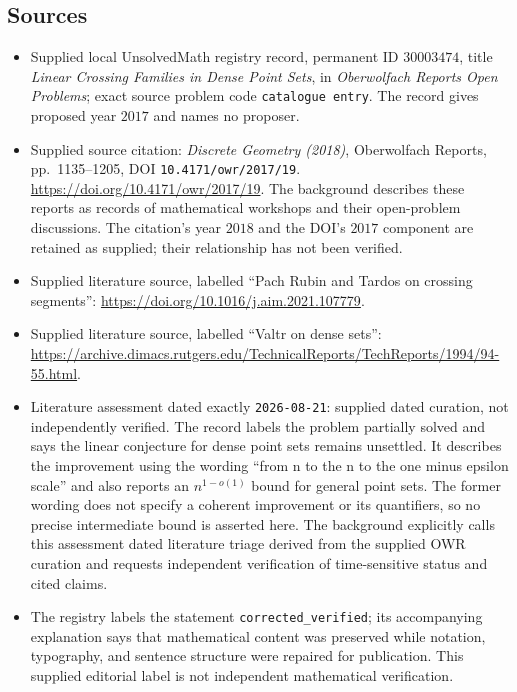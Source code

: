 \documentclass[11pt]{article}
\begin{document}
\subsection{Sources}
\begin{itemize}
\item Supplied local UnsolvedMath registry record, permanent ID \(30003474\), title \emph{Linear Crossing Families in Dense Point Sets}, in \emph{Oberwolfach Reports Open Problems}; exact source problem code \texttt{catalogue entry}. The record gives proposed year \(2017\) and names no proposer.
\item Supplied source citation: \emph{Discrete Geometry (2018)}, Oberwolfach Reports, pp.\ 1135--1205, DOI \texttt{10.4171/owr/2017/19}. \url{https://doi.org/10.4171/owr/2017/19}. The background describes these reports as records of mathematical workshops and their open-problem discussions. The citation's year \(2018\) and the DOI's \(2017\) component are retained as supplied; their relationship has not been verified.
\item Supplied literature source, labelled ``Pach Rubin and Tardos on crossing segments'': \url{https://doi.org/10.1016/j.aim.2021.107779}.
\item Supplied literature source, labelled ``Valtr on dense sets'': \url{https://archive.dimacs.rutgers.edu/TechnicalReports/TechReports/1994/94-55.html}.
\item Literature assessment dated exactly \texttt{2026-08-21}: supplied dated curation, not independently verified. The record labels the problem partially solved and says the linear conjecture for dense point sets remains unsettled. It describes the improvement using the wording ``from n to the n to the one minus epsilon scale'' and also reports an \(n^{1-o(1)}\) bound for general point sets. The former wording does not specify a coherent improvement or its quantifiers, so no precise intermediate bound is asserted here. The background explicitly calls this assessment dated literature triage derived from the supplied OWR curation and requests independent verification of time-sensitive status and cited claims.
\item The registry labels the statement \texttt{corrected\_verified}; its accompanying explanation says that mathematical content was preserved while notation, typography, and sentence structure were repaired for publication. This supplied editorial label is not independent mathematical verification.
\end{itemize}
\end{document}
